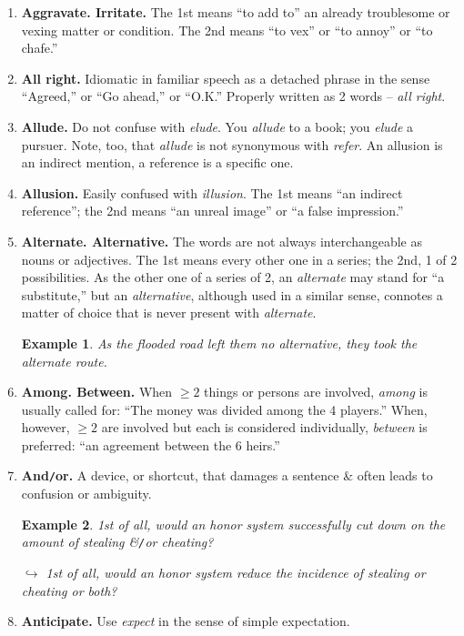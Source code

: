 \documentclass[oneside]{book}
\numberwithin{equation}{section}
\newtheorem{example}{Example}[chapter]
\begin{document}
\begin{enumerate}
	\item \textbf{Aggravate. Irritate.} The 1st means ``to add to'' an already troublesome or vexing matter or condition. The 2nd means ``to vex'' or ``to annoy'' or ``to chafe.''
	\item \textbf{All right.} Idiomatic in familiar speech as a detached phrase in the sense ``Agreed,'' or ``Go ahead,'' or ``O.K.'' Properly written as 2 words -- \textit{all right}.
	\item \textbf{Allude.} Do not confuse with \textit{elude}. You \textit{allude} to a book; you \textit{elude} a pursuer. Note, too, that \textit{allude} is not synonymous with \textit{refer}. An allusion is an indirect mention, a reference is a specific one.
	\item \textbf{Allusion.} Easily confused with \textit{illusion}. The 1st means ``an indirect reference''; the 2nd means ``an unreal image'' or ``a false impression.''
	\item \textbf{Alternate. Alternative.} The words are not always interchangeable as nouns or adjectives. The 1st means every other one in a series; the 2nd, 1 of 2 possibilities. As the other one of a series of 2, an \textit{alternate} may stand for ``a substitute,'' but an \textit{alternative}, although used in a similar sense, connotes a matter of choice that is never present with \textit{alternate}.
	
	\begin{example}
		As the flooded road left them no alternative, they took the alternate route.
	\end{example}
	\item \textbf{Among. Between.} When $\ge 2$ things or persons are involved, \textit{among} is usually called for: ``The money was divided among the 4 players.'' When, however, $\ge 2$ are involved but each is considered individually, \textit{between} is preferred: ``an agreement between the 6 heirs.''
	\item \textbf{And\texttt{/}or.} A device, or shortcut, that damages a sentence \& often leads to confusion or ambiguity.
	
	\begin{example}
		1st of all, would an honor system successfully cut down on the amount of stealing \&\texttt{/}or cheating?
		
		$\hookrightarrow$ 1st of all, would an honor system reduce the incidence of stealing or cheating or both?
	\end{example}
	\item \textbf{Anticipate.} Use \textit{expect} in the sense of simple expectation.
	

\end{enumerate}
\end{document}
